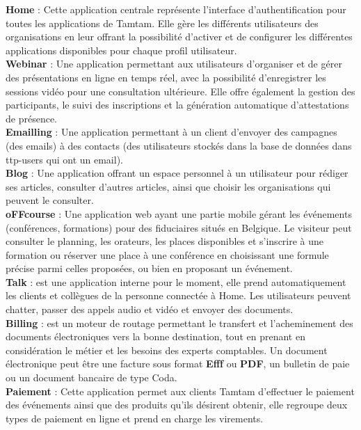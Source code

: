 \textbf{Home} : Cette application centrale représente l'interface d'authentification pour toutes les
applications de Tamtam. Elle gère les différents utilisateurs des organisations en leur offrant la
possibilité d'activer et de configurer les différentes applications disponibles pour chaque profil
utilisateur.\\[6pt]
\textbf{Webinar} : Une application permettant aux utilisateurs d'organiser et de gérer des
présentations en ligne en temps réel, avec la possibilité d'enregistrer les sessions vidéo pour
une consultation ultérieure. Elle offre également la gestion des participants, le suivi des
inscriptions et la génération automatique d'attestations de présence.\\[6pt]
\textbf{Emailling} : Une application permettant à un client d'envoyer des campagnes (des emails)
à des contacts (des utilisateurs stockés dans la base de données dans ttp-users qui ont un email).\\[6pt]
\textbf{Blog} : Une application offrant un espace personnel à un utilisateur pour rédiger ses articles,
consulter d'autres articles, ainsi que choisir les organisations qui peuvent le consulter.\\[6pt]
\textbf{oFFcourse} : Une application web ayant une partie mobile gérant les événements (conférences,
formations) pour des fiduciaires situés en Belgique. Le visiteur peut consulter le planning, les
orateurs, les places disponibles et s'inscrire à une formation ou réserver une place à une
conférence en choisissant une formule précise parmi celles proposées, ou bien en proposant un
événement.\\[6pt]
\textbf{Talk} : est une application interne pour le moment, elle prend automatiquement les clients et
collègues de la personne connectée à Home. Les utilisateurs peuvent chatter, passer des appels
audio et vidéo et envoyer des documents.\\[6pt]
\textbf{Billing} : est un moteur de routage permettant le transfert et l'acheminement des
documents électroniques vers la bonne destination, tout en prenant en considération le métier et
les besoins des experts comptables. Un document électronique peut être une facture sous format
\textbf{Efff} ou \textbf{PDF}, un bulletin de paie ou un document bancaire de type Coda.\\[6pt]
\textbf{Paiement} : Cette application permet aux clients Tamtam d'effectuer le paiement des
événements ainsi que des produits qu'ils désirent obtenir, elle regroupe deux types de paiement
en ligne et prend en charge les virements.\\[6pt]
